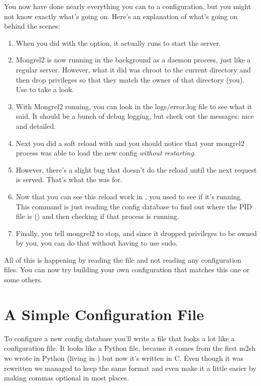 You now have done nearly everything you can to a configuration, but you might not know exactly
what's going on.  Here's an explanation of what's going on behind the scenes:

\begin{enumerate}
\item When you did  with the  option, it actually runs
     to start the server.
\item Mongrel2 is now running in the background as a daemon process, just like a regular server.
    However, what it did was chroot to the current directory and then drop privileges so that
    they match the owner of that directory (you).  Use  to take a look.
\item With Mongrel2 running, you can look in the logs/error.log file to see what it said.  It should
    be a bunch of debug logging, but check out the messages: nice and detailed.
\item Next you did a soft reload with  and you should notice that your mongrel2
    process was able to load the new config \emph{without restarting}.
\item However, there's a slight bug that doesn't do the reload until the next request is served. That's
    what the  was for.
\item Now that you can see this reload work in , you used  to
    see if it's running.  This command is just reading the config database to find out where the PID file
    is () and then checking if that process is running.
\item Finally, you tell mongrel2 to stop, and since it dropped privileges to be owned by you, you can do
    that without having to use sudo.
\end{enumerate}

All of this is happening by reading the  file and not reading any configuration
files.  You can now try building your own configuration that matches this one or some others.


\section{A Simple Configuration File}

To configure a new config database you'll write a file that looks a lot like
a configuration file.  It looks like a Python file, because it comes from the
first m2sh we wrote in Python (living in ) but now it's
written in C.  Even though it was rewritten we managed to keep the same format
and even make it a little easier by making commas optional in most places.

